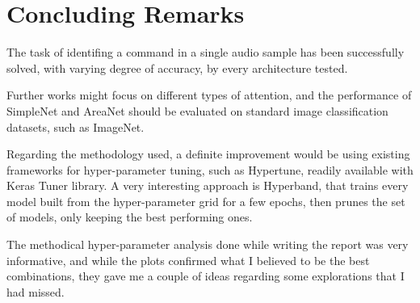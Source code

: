 
\section{Concluding Remarks}
\label{sec:conclusions}


The task of identifing a command in a single audio sample has been successfully
solved, with varying degree of accuracy, by every architecture tested.

Further works might focus on different types of attention, and the performance
of SimpleNet and AreaNet should be evaluated on standard image
classification datasets, such as ImageNet.

Regarding the methodology used, a definite improvement would be using existing
frameworks for hyper-parameter tuning, such as Hypertune, readily available
with Keras Tuner library. A very interesting approach is Hyperband, that trains
every model built from the hyper-parameter grid for a few epochs, then prunes
the set of models, only keeping the best performing ones.

The methodical hyper-parameter analysis done while writing the report was very
informative, and while the plots confirmed what I believed to be the best
combinations, they gave me a couple of ideas regarding some explorations that I
had missed.
